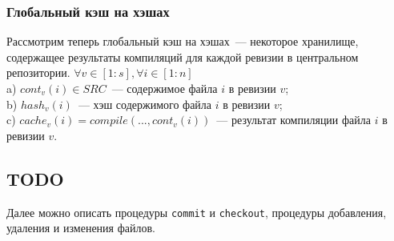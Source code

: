 \subsubsection{Глобальный кэш на хэшах}

Рассмотрим теперь глобальный кэш на хэшах~--- некоторое хранилище, содержащее результаты компиляций для каждой ревизии в центральном репозитории.
$\forall v \in [1:s], \forall i \in [1:n]$\\
\indent a) $cont_v(i) \in SRC$~--- содержимое файла $i$ в ревизии $v$;\\
\indent b) $hash_v(i)$~--- хэш содержимого файла $i$ в ревизии $v$;\\
\indent c) $cache_v(i) = compile(..., cont_v(i))$~--- результат компиляции файла $i$ в ревизии $v$.\\

\subsection{TODO}
Далее можно описать процедуры \texttt{commit} и \texttt{checkout}, процедуры добавления, удаления и изменения файлов.
